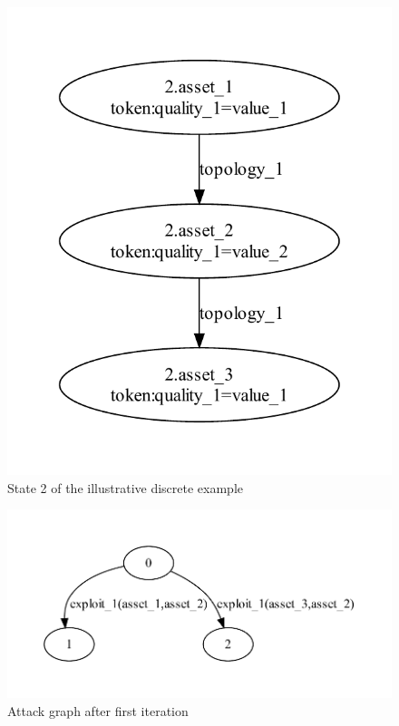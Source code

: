 \begin{figure}
\centering
\includegraphics[height=0.4\textheight]{ag_illustrative_simple/nm_state2}
\caption{State 2 of the illustrative discrete example}
\label{fig:ill_topology_2}
\end{figure}

\begin{figure}
\centering
\includegraphics[width=\textwidth]{ag_illustrative_simple/ag_depth1}
\caption{Attack graph after first iteration}
\label{fig:ill_ag_depth1}
\end{figure}

